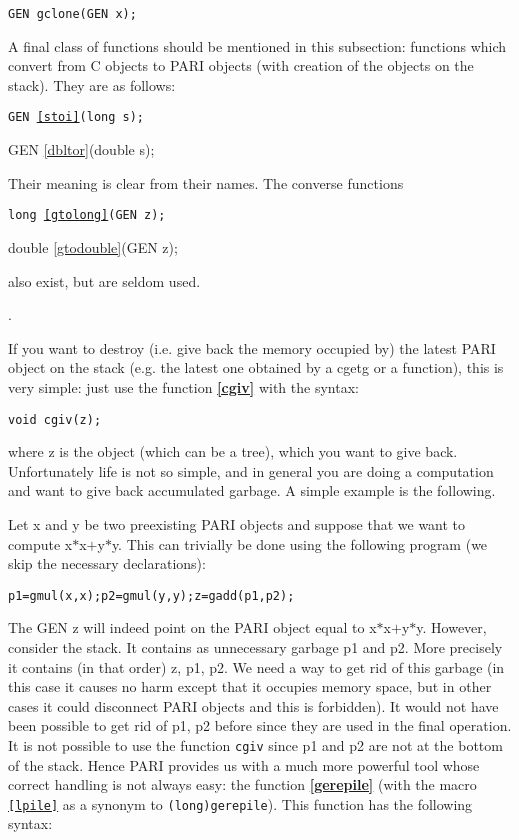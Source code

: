 {\tt GEN gclone(GEN x);}

A final class of functions should be mentioned in this subsection: functions which
convert from C objects to PARI objects (with creation of the objects on the stack).
They are as follows:

{\tt GEN \ref{stoi}(long s);

GEN \ref{dbltor}(double s);}

Their meaning is clear from their names. The converse functions

{\tt long \ref{gtolong}(GEN z);

double \ref{gtodouble}(GEN z);}

also exist, but are seldom used.

.

If you want to destroy (i.e. give back the memory occupied by) the latest PARI
object on the
stack (e.g. the latest one obtained by a cgetg or a function), this is very simple:
just use the function {\bf \ref{cgiv}} with the syntax:

{\tt void cgiv(z);}

where z is the object (which can be a tree), which you want to give back. Unfortunately
life is not so simple, and in general you are doing a computation and want to
give back accumulated garbage. A simple example is the following.

Let x and y be two preexisting PARI objects and suppose that we want to
compute x$*$x$+$y$*$y. This can trivially be done using the following program
(we skip the necessary declarations):

{\tt p1=gmul(x,x);p2=gmul(y,y);z=gadd(p1,p2);}

The GEN z will indeed point on the PARI object equal to x$*$x$+$y$*$y. However,
consider the stack. It contains as unnecessary garbage p1 and p2. More
precisely it contains (in that order) z, p1, p2. We need a way to get rid of
this garbage (in this case it causes no harm except that it
occupies memory space,
but in other cases it could disconnect PARI objects and this is forbidden).
It would not have been possible to get rid of p1, p2 before since they are
used in the final operation. It is not possible to use the function {\tt cgiv}
since p1 and p2 are not at the bottom of the stack. Hence PARI
provides us with a much more powerful tool whose correct handling is not
always easy: the function {\bf \ref{gerepile}} (with the macro 
{\tt \ref{lpile}} as a
synonym to {\tt (long)gerepile}). This function has the following syntax:

